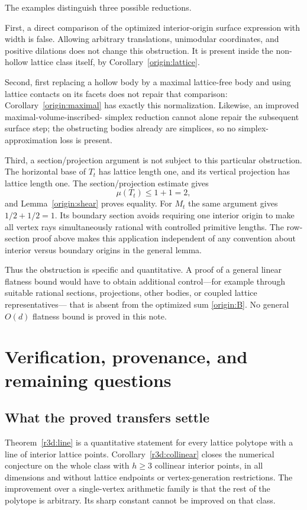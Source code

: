 \documentclass[11pt,a4paper]{article}
\theoremstyle{remark}\newtheorem{remark}[theorem]{Remark}
\begin{document}
The examples distinguish three possible reductions.

First, a direct comparison of the optimized interior-origin
surface expression with width is false. Allowing arbitrary
translations, unimodular coordinates, and positive dilations
does not change this obstruction. It is present inside the
non-hollow lattice class itself, by Corollary~\ref{origin:lattice}.

Second, first replacing a hollow body by a maximal lattice-free
body and using lattice contacts on its facets does not repair
that comparison: Corollary~\ref{origin:maximal} has exactly this
normalization. Likewise, an improved maximal-volume-inscribed-
simplex reduction cannot alone repair the subsequent surface
step; the obstructing bodies already are simplices, so no
simplex-approximation loss is present.

Third, a section/projection argument is not subject to this
particular obstruction. The horizontal base of $T_t$ has lattice
length one, and its vertical projection has lattice length one.
The section/projection estimate \cite[Lemma 2.1]{CSS} gives
\[
 \mu(T_t)\le1+1=2,
\]
and Lemma~\ref{origin:shear} proves equality. For $M_t$ the same
argument gives $1/2+1/2=1$. Its boundary section avoids requiring
one interior origin to make all vertex rays simultaneously
rational with controlled primitive lengths. The row-section
proof above makes this application independent of any convention
about interior versus boundary origins in the general lemma.

Thus the obstruction is specific and quantitative. A proof of
a general linear flatness bound would have to obtain additional
control---for example through suitable rational sections,
projections, other bodies, or coupled lattice representatives---
that is absent from the optimized sum \eqref{origin:B}.
No general $O(d)$ flatness bound is proved in this note.



\section{Verification, provenance, and remaining questions}
\label{r3:status}

\subsection{What the proved transfers settle}

Theorem~\ref{r3d:line} is a quantitative statement for every lattice
polytope with a line of interior lattice points. Corollary~\ref{r3d:collinear}
closes the numerical conjecture on the whole class with $h\ge3$
collinear interior points, in all dimensions and without lattice
endpoints or vertex-generation restrictions. The improvement over a
single-vertex arithmetic family is that the rest of the polytope is
arbitrary. Its sharp constant cannot be improved on that class.
\end{document}
